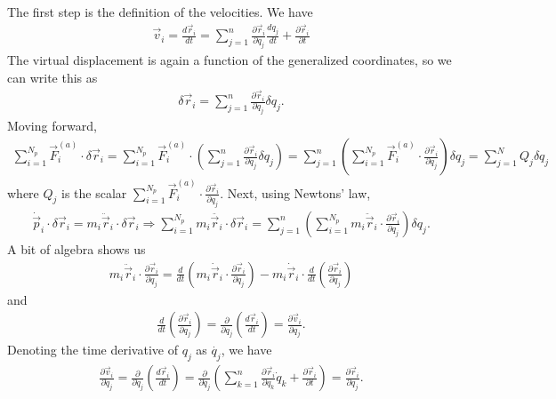 The first step is the definition of the velocities. We have
\begin{align}
    \vec{v}_{i} = \frac{d\vec{r}_{i}}{dt} = \sum_{j=1}^{n} \frac{\partial \vec{r}_{i}}{\partial q_{j}} \frac{d q_{j}}{dt} + \frac{\partial \vec{r}_{i}}{\partial t}
\end{align}
The virtual displacement is again a function of the generalized coordinates, so we can write this as
\begin{align}
    \delta \vec{r}_{i} = \sum_{j=1}^{n} \frac{\partial \vec{r}_{i}}{\partial q_{j}} \delta q_{j}.
\end{align}
Moving forward,
\begin{align}
    \sum_{i=1}^{N_{p}} \vec{F}_{i}^{(a)} \cdot \delta \vec{r}_{i} = \sum_{i=1}^{N_{p}} \vec{F}_{i}^{(a)} \cdot \left( \sum_{j=1}^{n} \frac{\partial \vec{r}_{i}}{\partial q_{j}} \delta q_{j} \right) = \sum_{j=1}^{n} \left( \sum_{i=1}^{N_{p}} \vec{F}_{i}^{(a)} \cdot \frac{\partial \vec{r}_{i}}{\partial q_{j}}\right) \delta q_{j} = \sum_{j=1}^{N} Q_{j} \delta q_{j}
\end{align}
where $Q_{j}$ is the scalar $\sum_{i=1}^{N_{p}} \vec{F}_{i}^{(a)} \cdot \frac{\partial \vec{r}_{i}}{\partial q_{j}}$. Next, using Newtons' law,
\begin{align}
    \dot{\vec{p}}_{i} \cdot \delta\vec{r}_{i} = m_{i}\ddot{\vec{r}}_{i} \cdot \delta\vec{r}_{i} \Rightarrow \sum_{i=1}^{N_{p}} m_{i} \ddot{\vec{r}_{i}} \cdot \delta\vec{r}_{i} = \sum_{j=1}^{n} \left( \sum_{i=1}^{N_{p}} m_{i} \ddot{\vec{r}}_{i} \cdot \frac{\partial \vec{r}_{i}}{\partial q_{j}} \right) \delta q_{j}.
\end{align}
A bit of algebra shows us
\begin{align}
    m_{i} \ddot{\vec{r}}_{i} \cdot \frac{\partial \vec{r}_{i}}{\partial q_{j}} = \frac{d}{dt} \left( m_{i} \dot{\vec{r}}_{i} \cdot \frac{\partial \vec{r}_{i}}{\partial q_{j}} \right) - m_{i} \dot{\vec{r}}_{i} \cdot \frac{d}{dt} \left( \frac{\partial \vec{r}_{i}}{\partial q_{j}} \right)
\end{align}
and
\begin{align}
    \frac{d}{dt} \left( \frac{\partial \vec{r}_{i}}{\partial q_{j}} \right) = \frac{\partial}{\partial q_{j}} \left( \frac{d\vec{r}_{i}}{dt} \right) = \frac{\partial \vec{v}_{i}}{\partial q_{j}}.
\end{align}
Denoting the time derivative of $q_{j}$ as $\dot{q_{j}}$, we have
\begin{align}
    \frac{\partial \vec{v}_{i}}{\partial \dot{q}_{j}} = \frac{\partial}{\partial \dot{q}_{j}} \left( \frac{d \vec{r}_{i}}{dt} \right) = \frac{\partial}{\partial \dot{q}_{j}} \left( \sum_{k=1}^{n} \frac{\partial \vec{r}_{i}}{\partial q_{k}} \dot{q}_{k} + \frac{\partial \vec{r}_{i}}{\partial t} \right) = \frac{\partial \vec{r}_{i}}{\partial q_{j}}.
\end{align}
